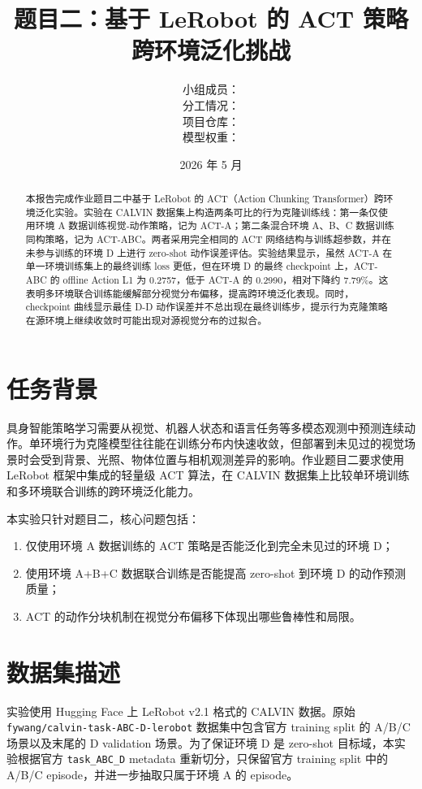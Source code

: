 \documentclass[11pt,a4paper]{ctexart}
\title{\textbf{题目二：基于 LeRobot 的 ACT 策略跨环境泛化挑战}}
\author{
  小组成员：\todo{姓名 / 学号待填写}\\
  分工情况：\todo{待填写：数据准备、训练评估、报告撰写等具体分工}\\
  项目仓库：\githuburl\\
  模型权重：\weightsurl
}
\date{2026 年 5 月}
\begin{document}
\maketitle

\begin{abstract}
本报告完成作业题目二中基于 LeRobot 的 ACT（Action Chunking Transformer）跨环境泛化实验。实验在 CALVIN 数据集上构造两条可比的行为克隆训练线：第一条仅使用环境 A 数据训练视觉-动作策略，记为 ACT-A；第二条混合环境 A、B、C 数据训练同构策略，记为 ACT-ABC。两者采用完全相同的 ACT 网络结构与训练超参数，并在未参与训练的环境 D 上进行 zero-shot 动作误差评估。实验结果显示，虽然 ACT-A 在单一环境训练集上的最终训练 loss 更低，但在环境 D 的最终 checkpoint 上，ACT-ABC 的 offline Action L1 为 0.2757，低于 ACT-A 的 0.2990，相对下降约 7.79\%。这表明多环境联合训练能缓解部分视觉分布偏移，提高跨环境泛化表现。同时，checkpoint 曲线显示最佳 D-D 动作误差并不总出现在最终训练步，提示行为克隆策略在源环境上继续收敛时可能出现对源视觉分布的过拟合。
\end{abstract}

\section{任务背景}
具身智能策略学习需要从视觉、机器人状态和语言任务等多模态观测中预测连续动作。单环境行为克隆模型往往能在训练分布内快速收敛，但部署到未见过的视觉场景时会受到背景、光照、物体位置与相机观测差异的影响。作业题目二要求使用 LeRobot 框架中集成的轻量级 ACT 算法，在 CALVIN 数据集上比较单环境训练和多环境联合训练的跨环境泛化能力。

本实验只针对题目二，核心问题包括：
\begin{enumerate}
  \item 仅使用环境 A 数据训练的 ACT 策略是否能泛化到完全未见过的环境 D；
  \item 使用环境 A+B+C 数据联合训练是否能提高 zero-shot 到环境 D 的动作预测质量；
  \item ACT 的动作分块机制在视觉分布偏移下体现出哪些鲁棒性和局限。
\end{enumerate}

\section{数据集描述}
实验使用 Hugging Face 上 LeRobot v2.1 格式的 CALVIN 数据。原始 \texttt{fywang/calvin-task-ABC-D-lerobot} 数据集中包含官方 training split 的 A/B/C 场景以及末尾的 D validation 场景。为了保证环境 D 是 zero-shot 目标域，本实验根据官方 \texttt{task\_ABC\_D} metadata 重新切分，只保留官方 training split 中的 A/B/C episode，并进一步抽取只属于环境 A 的 episode。
\end{document}
